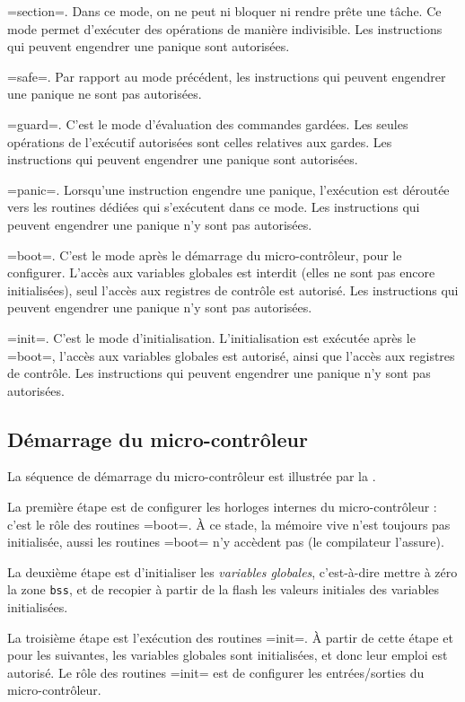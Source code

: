 \plm=section=. Dans ce mode, on ne peut ni bloquer ni rendre prête une tâche. Ce mode permet d'exécuter des opérations de manière indivisible. Les instructions qui peuvent engendrer une panique sont autorisées.

\plm=safe=. Par rapport au mode précédent, les instructions qui peuvent engendrer une panique ne sont pas autorisées.

\plm=guard=. C'est le mode d'évaluation des commandes gardées. Les seules opérations de l'exécutif autorisées sont celles relatives aux gardes. Les instructions qui peuvent engendrer une panique sont autorisées.

\plm=panic=. Lorsqu'une instruction engendre une panique, l'exécution est déroutée vers les routines dédiées qui s'exécutent dans ce mode.  Les instructions qui peuvent engendrer une panique n'y sont pas autorisées.

\plm=boot=. C'est le mode après le démarrage du micro-contrôleur, pour le configurer. L'accès aux variables globales est interdit (elles ne sont pas encore initialisées), seul l'accès aux registres de contrôle est autorisé. Les instructions qui peuvent engendrer une panique n'y sont pas autorisées.


\plm=init=. C'est le mode d'initialisation. L'initialisation est exécutée après le \plm=boot=, l'accès aux variables globales est autorisé, ainsi que l'accès aux registres de contrôle. Les instructions qui peuvent engendrer une panique n'y sont pas autorisées.






\subsection{Démarrage du micro-contrôleur}

La séquence de démarrage du micro-contrôleur est illustrée par la .

La première étape est de configurer les horloges internes du micro-contrôleur : c'est le rôle des routines \plm=boot=. À ce stade, la mémoire vive n'est toujours pas initialisée, aussi les routines \plm=boot= n'y accèdent pas (le compilateur l'assure).

La deuxième étape est d'initialiser les \emph{variables globales}, c'est-à-dire mettre à zéro la zone \texttt{bss}, et de recopier à partir de la flash les valeurs initiales des variables initialisées.

La troisième étape est l'exécution des routines \plm=init=. À partir de cette étape et pour les suivantes, les variables globales sont initialisées, et donc leur emploi est autorisé. Le rôle des routines \plm=init= est de configurer les entrées/sorties du micro-contrôleur.

